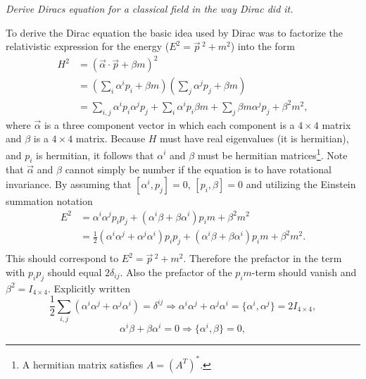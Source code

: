 \begin{example}
	\emph{Derive Diracs equation for a classical field in the way Dirac did it.}\newline
	
	To derive the Dirac equation the basic idea used by Dirac was to factorize the relativistic expression for the energy ($E^2=\vec{p}\,^2+m^2$) into the form
	\begin{equation}
		\begin{split}
			H^2&=(\vec{\alpha}\cdot\vec{p}+\beta m)^2\\
			&=(\sum_{i} \alpha^{i}p_i+\beta m)(\sum_{j} \alpha^{j}p_j+ \beta m)\\
			&=\sum_{i,j} \alpha^{i}p_i \alpha^{j}p_j+\sum_{i} \alpha^{i}p_i\beta m+\sum_{j} \beta m \alpha^{j}p_j+ \beta^2m^2,
		\end{split}
		\label{bla5}
	\end{equation} 	
	where $\vec{\alpha}$ is a three component vector in which each component is a $4\times4$ matrix and $\beta$ is a $4\times4$ matrix. Because $H$ must have real eigenvalues (it is hermitian), and $p_i$ is hermitian, it follows that $\alpha^{i}$ and $\beta$ must be hermitian matrices\footnote{A hermitian matrix satisfies $A=(A^T)^*$.}. Note that $\vec{\alpha}$ and $\beta$ cannot simply be number if the equation is to have rotational invariance. By assuming that $[\alpha^{i},p_j]=0$, $[p_i,\beta]=0$ and utilizing the Einstein summation notation
	\begin{equation}
		\begin{split}
			E^2&=\alpha^{i}\alpha^{j}p_ip_j+(\alpha^{i}\beta+\beta\alpha^{i})p_im+\beta^2m^2\\
			&=\frac{1}{2}(\alpha^{i}\alpha^{j}+\alpha^{j}\alpha^{i})p_ip_j+(\alpha^{i}\beta+\beta\alpha^{i})p_im+\beta^2m^2.\\
		\end{split}
	\end{equation} 	
	This should correspond to $E^2=\vec{p}\,^2+m^2$. Therefore the prefactor in the term with $p_ip_j$ should equal $2\delta_{ij}$. Also the prefactor of the $p_im$-term should vanish and $\beta^2=I_{4\times 4}$. Explicitly written
	\begin{equation}
		\frac{1}{2}\sum_{i,j}(\alpha^{i}\alpha^{j}+\alpha^{j}\alpha^{i})=\delta^{ij}\Rightarrow \alpha^{i}\alpha^{j}+\alpha^{j}\alpha^{i}=\{\alpha^{i},\alpha^{j}\}=2I_{4\times 4},
	\end{equation} 
	\begin{equation}
		\alpha^{i}\beta+\beta\alpha^{i}=0\Rightarrow \{\alpha^{i},\beta\}=0,

\end{equation}
\end{example}

